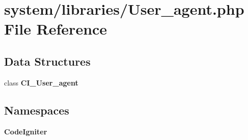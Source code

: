 \section{system/libraries/\-User\-\_\-agent.php File Reference}
\label{_user__agent_8php}
\subsection*{Data Structures}
\begin{DoxyCompactItemize}
\item 
class {\bf C\-I\-\_\-\-User\-\_\-agent}
\end{DoxyCompactItemize}
\subsection*{Namespaces}
\begin{DoxyCompactItemize}
\item 
{\bf Code\-Igniter}
\end{DoxyCompactItemize}
